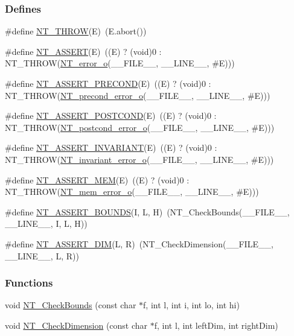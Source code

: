 \subsubsection*{Defines}
\begin{DoxyCompactItemize}
\item 
\#define \hyperlink{nt__error__obj_8h_a65b179dcb358c24a6d0ae5958e028e95}{NT\_\-THROW}(E)~(E.abort())
\item 
\#define \hyperlink{nt__error__obj_8h_a111582e2ff30c12b1c4e428c64ab65cd}{NT\_\-ASSERT}(E)~((E) ? (void)0 : NT\_\-THROW(\hyperlink{class_n_t__error__o}{NT\_\-error\_\-o}(\_\-\_\-FILE\_\-\_\-, \_\-\_\-LINE\_\-\_\-, \#E)))
\item 
\#define \hyperlink{nt__error__obj_8h_a9985f2da2d0e88bd49e36c62bac01ab1}{NT\_\-ASSERT\_\-PRECOND}(E)~((E) ? (void)0 : NT\_\-THROW(\hyperlink{class_n_t__precond__error__o}{NT\_\-precond\_\-error\_\-o}(\_\-\_\-FILE\_\-\_\-, \_\-\_\-LINE\_\-\_\-, \#E)))
\item 
\#define \hyperlink{nt__error__obj_8h_a1b849e8132e213f4a3ec1665d3a9a1db}{NT\_\-ASSERT\_\-POSTCOND}(E)~((E) ? (void)0 : NT\_\-THROW(\hyperlink{class_n_t__postcond__error__o}{NT\_\-postcond\_\-error\_\-o}(\_\-\_\-FILE\_\-\_\-, \_\-\_\-LINE\_\-\_\-, \#E)))
\item 
\#define \hyperlink{nt__error__obj_8h_a1067274046d0757a3e02c30478aa2dae}{NT\_\-ASSERT\_\-INVARIANT}(E)~((E) ? (void)0 : NT\_\-THROW(\hyperlink{class_n_t__invariant__error__o}{NT\_\-invariant\_\-error\_\-o}(\_\-\_\-FILE\_\-\_\-, \_\-\_\-LINE\_\-\_\-, \#E)))
\item 
\#define \hyperlink{nt__error__obj_8h_aa39957fc9ded9680207e1cd72f0a1900}{NT\_\-ASSERT\_\-MEM}(E)~((E) ? (void)0 : NT\_\-THROW(\hyperlink{class_n_t__mem__error__o}{NT\_\-mem\_\-error\_\-o}(\_\-\_\-FILE\_\-\_\-, \_\-\_\-LINE\_\-\_\-, \#E)))
\item 
\#define \hyperlink{nt__error__obj_8h_a00099c3e316e8080ccf143b032c86ebe}{NT\_\-ASSERT\_\-BOUNDS}(I, L, H)~(NT\_\-CheckBounds(\_\-\_\-FILE\_\-\_\-, \_\-\_\-LINE\_\-\_\-, I, L, H))
\item 
\#define \hyperlink{nt__error__obj_8h_a4cc3d014d86c01226c981a1c34ec1fb9}{NT\_\-ASSERT\_\-DIM}(L, R)~(NT\_\-CheckDimension(\_\-\_\-FILE\_\-\_\-, \_\-\_\-LINE\_\-\_\-, L, R))
\end{DoxyCompactItemize}
\subsubsection*{Functions}
\begin{DoxyCompactItemize}
\item 
void \hyperlink{nt__error__obj_8h_a6825e1f27c6858b367f245d4a38c581f}{NT\_\-CheckBounds} (const char $\ast$f, int l, int i, int lo, int hi)
\item 
void \hyperlink{nt__error__obj_8h_a48925cae51e4408d2ca2df3ce3e0fd49}{NT\_\-CheckDimension} (const char $\ast$f, int l, int leftDim, int rightDim)
\end{DoxyCompactItemize}


